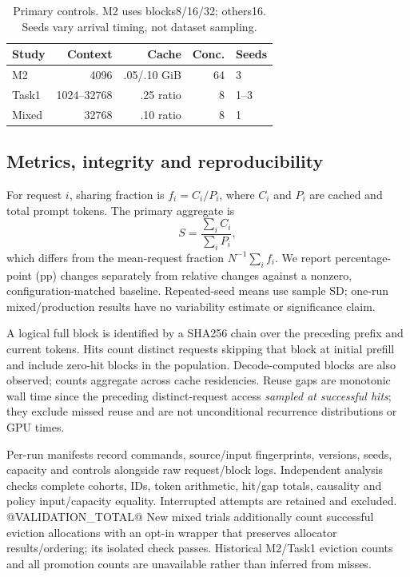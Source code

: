 \documentclass{article}
\begin{document}
\begin{table}[t]
\centering\small
\caption{Primary controls. M2 uses blocks8/16/32; others16. Seeds vary arrival timing, not dataset sampling.}
\begin{tabular}{lrrrl}\toprule
Study & Context & Cache & Conc. & Seeds\\\midrule
M2 & 4096 & .05/.10 GiB & 64 & 3\\
Task1 & 1024--32768 & .25 ratio & 8 & 1--3\\
Mixed & 32768 & .10 ratio & 8 & 1\\\bottomrule
\end{tabular}
\end{table}

\subsection{Metrics, integrity and reproducibility}
For request $i$, sharing fraction is $f_i=C_i/P_i$, where $C_i$ and $P_i$ are cached and total prompt tokens. The primary aggregate is
\begin{equation}
S=\frac{\sum_i C_i}{\sum_i P_i},
\end{equation}
which differs from the mean-request fraction $N^{-1}\sum_i f_i$. We report percentage-point (pp) changes separately from relative changes against a nonzero, configuration-matched baseline. Repeated-seed means use sample SD; one-run mixed/production results have no variability estimate or significance claim.

A logical full block is identified by a SHA256 chain over the preceding prefix and current tokens. Hits count distinct requests skipping that block at initial prefill and include zero-hit blocks in the population. Decode-computed blocks are also observed; counts aggregate across cache residencies. Reuse gaps are monotonic wall time since the preceding distinct-request access \emph{sampled at successful hits}; they exclude missed reuse and are not unconditional recurrence distributions or GPU times.

Per-run manifests record commands, source/input fingerprints, versions, seeds, capacity and controls alongside raw request/block logs. Independent analysis checks complete cohorts, IDs, token arithmetic, hit/gap totals, causality and policy input/capacity equality. Interrupted attempts are retained and excluded. @VALIDATION_TOTAL@ New mixed trials additionally count successful eviction allocations with an opt-in wrapper that preserves allocator results/ordering; its isolated check passes. Historical M2/Task1 eviction counts and all promotion counts are unavailable rather than inferred from misses.
\end{document}
